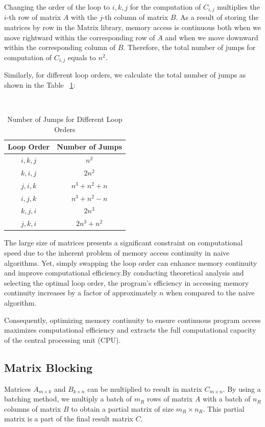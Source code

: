 \documentclass[conference]{IEEEtran}
\begin{document}
	Changing the order of the loop to $i,k,j$ for the computation of $C_{i,j}$ multiplies the $i$-th row of matrix $A$ with the $j$-th column of matrix $B$. As a result of storing the matrices by row in the Matrix library, memory access is continuous both when we move rightward within the corresponding row of $A$ and when we move downward within the corresponding column of $B$. Therefore, the total number of jumps for computation of $C_{i,j}$ equals to $n^2$.
	
	Similarly, for different loop orders, we calculate the total number of jumps as shown in the Table ~\ref{tab:loopjumps}:
	
	\begin{table}[htbp]
		\caption{Number of Jumps for Different Loop Orders}
		\centering\
		\setlength\extrarowheight{2pt}
		\label{tab:loopjumps}
		\begin{tabular}{|c|c|}
			\hline
			Loop Order & Number of Jumps \\ \hline
			$i,k,j$ & $n^2$ \\ \hline
			$k,i,j$ & $2n^2$ \\ \hline
			$j,i,k$ & $n^3 + n^2 + n$ \\ \hline
			$i,j,k$ & $n^3 + n^2 - n$ \\ \hline
			$k,j,i$ & $2n^3$ \\ \hline
			$j,k,i$ & $2n^3 + n^2$ \\ \hline
		\end{tabular}
	\end{table}
	
	The large size of matrices presents a significant constraint on computational speed due to the inherent problem of memory access continuity in naive algorithms. Yet, simply swapping the loop order can enhance memory continuity and improve computational efficiency.By conducting theoretical analysis and selecting the optimal loop order, the program's efficiency in accessing memory continuity increases by a factor of approximately $n$ when compared to the naive algorithm.
	
	Consequently, optimizing memory continuity to ensure continuous program access maximizes computational efficiency and extracts the full computational capacity of the central processing unit (CPU).
	\subsection{Matrix Blocking}
	Matrices $A_{m \times k}$ and $B_{k \times n}$ can be multiplied to result in matrix $C_{m \times n}$. By using a batching method, we multiply a batch of $m_R$ rows of matrix $A$ with a batch of $n_R$ columns of matrix $B$ to obtain a partial matrix of size $m_R \times n_R$. This partial matrix is a part of the final result matrix $C$.
	
\end{document}
